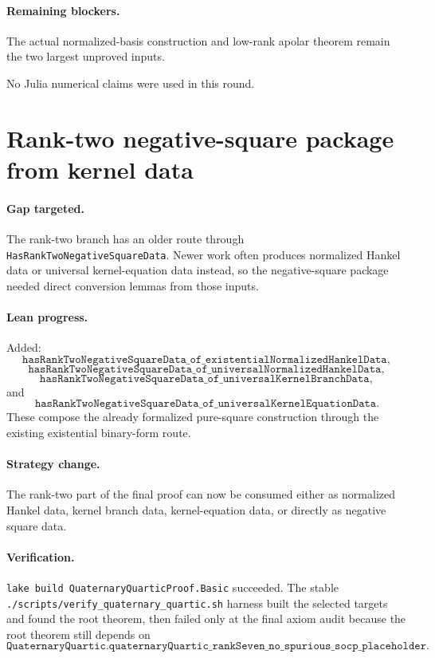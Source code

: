 \documentclass[11pt]{article}
\begin{document}
\paragraph{Remaining blockers.}
The actual normalized-basis construction and low-rank apolar theorem remain the
two largest unproved inputs.

No Julia numerical claims were used in this round.

\section*{Rank-two negative-square package from kernel data}

\paragraph{Gap targeted.}
The rank-two branch has an older route through
\texttt{HasRankTwoNegativeSquareData}.  Newer work often produces normalized
Hankel data or universal kernel-equation data instead, so the negative-square
package needed direct conversion lemmas from those inputs.

\paragraph{Lean progress.}
Added:
\[
\texttt{hasRankTwoNegativeSquareData\_of\_existentialNormalizedHankelData},
\]
\[
\texttt{hasRankTwoNegativeSquareData\_of\_universalNormalizedHankelData},
\]
\[
\texttt{hasRankTwoNegativeSquareData\_of\_universalKernelBranchData},
\]
and
\[
\texttt{hasRankTwoNegativeSquareData\_of\_universalKernelEquationData}.
\]
These compose the already formalized pure-square construction through the
existing existential binary-form route.

\paragraph{Strategy change.}
The rank-two part of the final proof can now be consumed either as normalized
Hankel data, kernel branch data, kernel-equation data, or directly as negative
square data.

\paragraph{Verification.}
\texttt{lake build QuaternaryQuarticProof.Basic} succeeded.  The stable
\texttt{./scripts/verify\_quaternary\_quartic.sh} harness built the selected
targets and found the root theorem, then failed only at the final axiom audit
because the root theorem still depends on
\[
\texttt{QuaternaryQuartic.quaternaryQuartic\_rankSeven\_no\_spurious\_socp\_placeholder}.
\]
\end{document}
